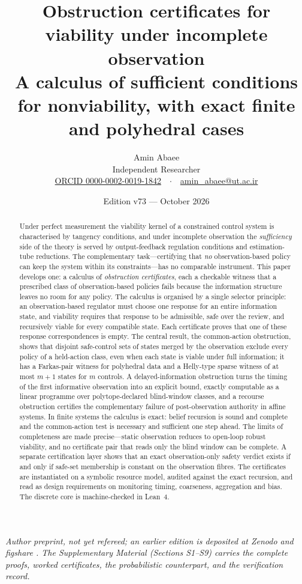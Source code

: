 \documentclass[11pt,a4paper]{article}
\title{\vspace{-1.2em}Obstruction certificates for viability under incomplete observation\\[0.3em]
{\large A calculus of sufficient conditions for nonviability, with exact finite and polyhedral cases}}
\author{Amin Abaee\\[0.3em]
{\normalsize Independent Researcher}\\
{\normalsize \href{https://orcid.org/0000-0002-0019-1842}{ORCID 0000-0002-0019-1842}\ \ $\cdot$\ \ \href{mailto:amin_abaee@ut.ac.ir}{amin\_abaee@ut.ac.ir}}}
\date{Edition v73 --- October 2026}
\theoremstyle{plain}
\theoremstyle{definition}
\theoremstyle{remark}
\begin{document}
\maketitle
\vspace{-1.5em}
\begin{center}\small\emph{Author preprint, not yet refereed; an earlier edition is deposited at Zenodo and figshare \citep{abaee2026preprint}. The Supplementary Material (Sections S1--S9) carries the complete proofs, worked certificates, the probabilistic counterpart, and the verification record.}\end{center}

\begin{abstract}
\noindent
Under perfect measurement the viability kernel of a constrained control system is characterised by tangency conditions, and under incomplete observation the \emph{sufficiency} side of the theory is served by output-feedback regulation conditions and estimation-tube reductions. The complementary task---certifying that \emph{no} observation-based policy can keep the system within its constraints---has no comparable instrument. This paper develops one: a calculus of \emph{obstruction certificates}, each a checkable witness that a prescribed class of observation-based policies fails because the information structure leaves no room for any policy. The calculus is organised by a single selector principle: an observation-based regulator must choose one response for an entire information state, and viability requires that response to be admissible, safe over the review, and recursively viable for every compatible state. Each certificate proves that one of these response correspondences is empty. The central result, the common-action obstruction, shows that disjoint safe-control sets of states merged by the observation exclude every policy of a held-action class, even when each state is viable under full information; it has a Farkas-pair witness for polyhedral data and a Helly-type sparse witness of at most $m+1$ states for $m$ controls. A delayed-information obstruction turns the timing of the first informative observation into an explicit bound, exactly computable as a linear programme over polytope-declared blind-window classes, and a recourse obstruction certifies the complementary failure of post-observation authority in affine systems. In finite systems the calculus is exact: belief recursion is sound and complete and the common-action test is necessary and sufficient one step ahead. The limits of completeness are made precise---static observation reduces to open-loop robust viability, and no certificate pair that reads only the blind window can be complete. A separate certification layer shows that an exact observation-only safety verdict exists if and only if safe-set membership is constant on the observation fibres. The certificates are instantiated on a symbolic resource model, audited against the exact recursion, and read as design requirements on monitoring timing, coarseness, aggregation and bias. The discrete core is machine-checked in Lean~4.
\end{abstract}
\end{document}
